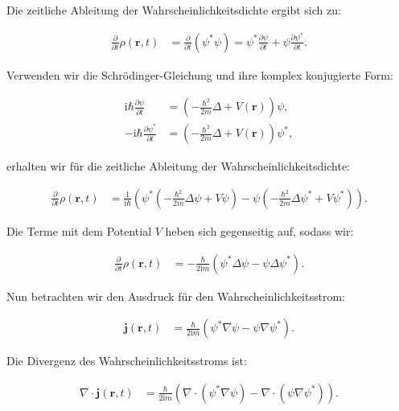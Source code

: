 \documentclass[11pt,a4paper]{article}
\begin{document}
Die zeitliche Ableitung der Wahrscheinlichkeitsdichte ergibt sich zu:

\begin{align*}
\frac{\partial}{\partial t} \rho(\mathbf{r}, t) &= \frac{\partial}{\partial t} (\psi^* \psi) = \psi^* \frac{\partial \psi}{\partial t} + \psi \frac{\partial \psi^*}{\partial t}.
\end{align*}

Verwenden wir die Schrödinger-Gleichung und ihre komplex konjugierte Form:

\begin{align*}
\mathrm{i} \hbar \frac{\partial \psi}{\partial t} &= \left(-\frac{\hbar^2}{2m} \Delta + V(\mathbf{r})\right) \psi, \\
-\mathrm{i} \hbar \frac{\partial \psi^*}{\partial t} &= \left(-\frac{\hbar^2}{2m} \Delta + V(\mathbf{r})\right) \psi^*,
\end{align*}

erhalten wir für die zeitliche Ableitung der Wahrscheinlichkeitsdichte:

\begin{align*}
\frac{\partial}{\partial t} \rho(\mathbf{r}, t) &= \frac{1}{\mathrm{i} \hbar} \left( \psi^* \left(-\frac{\hbar^2}{2m} \Delta \psi + V \psi \right) - \psi \left(-\frac{\hbar^2}{2m} \Delta \psi^* + V \psi^* \right) \right).
\end{align*}

Die Terme mit dem Potential \( V \) heben sich gegenseitig auf, sodass wir:

\begin{align*}
\frac{\partial}{\partial t} \rho(\mathbf{r}, t) &= -\frac{\hbar}{2 \mathrm{i} m} \left( \psi^* \Delta \psi - \psi \Delta \psi^* \right).
\end{align*}

Nun betrachten wir den Ausdruck für den Wahrscheinlichkeitsstrom:

\begin{align*}
\mathbf{j}(\mathbf{r}, t) &= \frac{\hbar}{2 \mathrm{i} m} \left( \psi^* \nabla \psi - \psi \nabla \psi^* \right).
\end{align*}

Die Divergenz des Wahrscheinlichkeitsstroms ist:

\begin{align*}
\nabla \cdot \mathbf{j}(\mathbf{r}, t) &= \frac{\hbar}{2 \mathrm{i} m} \left( \nabla \cdot (\psi^* \nabla \psi) - \nabla \cdot (\psi \nabla \psi^*) \right).
\end{align*}
\end{document}
